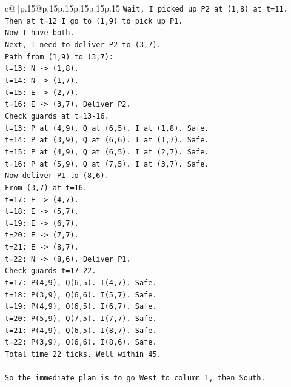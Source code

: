 \documentclass{article}
\begin{document}
{\begin{supertabular}{c@{$\;$}|p{.15\linewidth}@{}p{.15\linewidth}p{.15\linewidth}p{.15\linewidth}p{.15\linewidth}p{.15\linewidth}}
{{{\texttt{Wait, I picked up P2 at (1,8) at t=11.} \\
\texttt{Then at t=12 I go to (1,9) to pick up P1.} \\
\texttt{Now I have both.} \\
\texttt{Next, I need to deliver P2 to (3,7).} \\
\texttt{Path from (1,9) to (3,7):} \\
\texttt{t=13: N {-}> (1,8).} \\
\texttt{t=14: N {-}> (1,7).} \\
\texttt{t=15: E {-}> (2,7).} \\
\texttt{t=16: E {-}> (3,7). Deliver P2.} \\
\texttt{Check guards at t=13{-}16.} \\
\texttt{t=13: P at (4,9), Q at (6,5). I at (1,8). Safe.} \\
\texttt{t=14: P at (3,9), Q at (6,6). I at (1,7). Safe.} \\
\texttt{t=15: P at (4,9), Q at (6,5). I at (2,7). Safe.} \\
\texttt{t=16: P at (5,9), Q at (7,5). I at (3,7). Safe.} \\
\texttt{Now deliver P1 to (8,6).} \\
\texttt{From (3,7) at t=16.} \\
\texttt{t=17: E {-}> (4,7).} \\
\texttt{t=18: E {-}> (5,7).} \\
\texttt{t=19: E {-}> (6,7).} \\
\texttt{t=20: E {-}> (7,7).} \\
\texttt{t=21: E {-}> (8,7).} \\
\texttt{t=22: N {-}> (8,6). Deliver P1.} \\
\texttt{Check guards t=17{-}22.} \\
\texttt{t=17: P(4,9), Q(6,5). I(4,7). Safe.} \\
\texttt{t=18: P(3,9), Q(6,6). I(5,7). Safe.} \\
\texttt{t=19: P(4,9), Q(6,5). I(6,7). Safe.} \\
\texttt{t=20: P(5,9), Q(7,5). I(7,7). Safe.} \\
\texttt{t=21: P(4,9), Q(6,5). I(8,7). Safe.} \\
\texttt{t=22: P(3,9), Q(6,6). I(8,6). Safe.} \\
\texttt{Total time 22 ticks. Well within 45.} \\
\\ 
\texttt{So the immediate plan is to go West to column 1, then South.} \\
}}}
\end{supertabular}}
\end{document}
